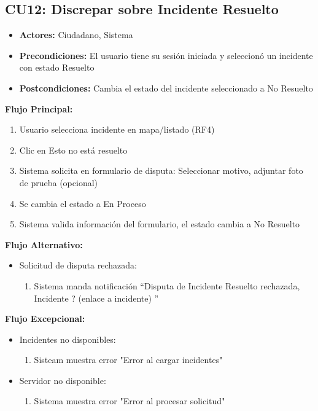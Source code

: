 \begin{multicols}{2}
\subsection*{CU12: Discrepar sobre Incidente Resuelto}
\begin{itemize}
    \item \textbf{Actores:} Ciudadano, Sistema
    \item \textbf{Precondiciones:} El usuario tiene su sesión iniciada y seleccionó un incidente con estado Resuelto
    \item \textbf{Postcondiciones:} Cambia el estado del incidente seleccionado a No Resuelto
\end{itemize}
\textbf{Flujo Principal:}
\begin{enumerate}
    \item Usuario selecciona incidente en mapa/listado (RF4)
    \item Clic en Esto no está resuelto
    \item Sistema solicita en formulario de disputa: Seleccionar motivo, adjuntar foto de prueba (opcional)
    \item Se cambia el estado a En Proceso
    \item Sistema valida información del formulario, el estado cambia a No Resuelto
\end{enumerate}

\textbf{Flujo Alternativo:}
\begin{itemize}
    \item Solicitud de disputa rechazada:
    \begin{enumerate}
        \item Sistema manda notificación ``Disputa de Incidente Resuelto rechazada, Incidente ? (enlace a incidente) ''
    \end{enumerate}
\end{itemize}

\textbf{Flujo Excepcional:}
\begin{itemize}
    \item Incidentes no disponibles:
    \begin{enumerate}
        \item Sisteam muestra error "Error al cargar incidentes"
    \end{enumerate}
    \item Servidor no disponible:
    \begin{enumerate}
        \item Sistema muestra error "Error al procesar solicitud"
    \end{enumerate}
\end{itemize}


\end{multicols}
